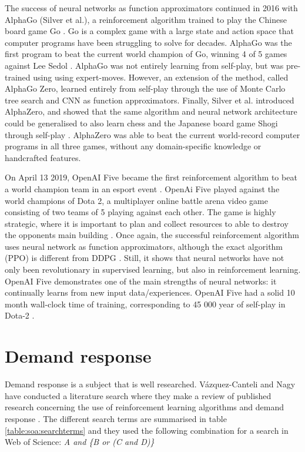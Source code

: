 \documentclass[class=book, crop=false, 11pt]{standalone}
\begin{document}
The success of neural networks as function approximators continued in 2016 with AlphaGo (Silver et al.), a reinforcement algorithm trained to play the Chinese board game Go \cite{alphago}. Go is a complex game with a large state and action space that computer programs have been struggling to solve for decades. AlphaGo was the first program to beat the current world champion of Go, winning 4 of 5 games against Lee Sedol \cite{Sutton1998}. AlphaGo was not entirely learning from self-play, but was pre-trained using using expert-moves. However, an extension of the method, called AlphaGo Zero, learned entirely from self-play through the use of Monte Carlo tree search and CNN as function approximators. Finally,  Silver et al. introduced AlphaZero, and showed that the same algorithm and neural network architecture could be generalised to also learn chess and the Japanese board game Shogi through self-play \cite{alphazero}. AlphaZero was able to beat the current world-record computer programs in all three games, without any domain-specific knowledge or handcrafted features. 

On April 13 2019, OpenAI Five became the first reinforcement algorithm to beat a world champion team in an esport event \cite{openai_dota}. OpenAi Five played against the world champions of Dota 2, a multiplayer online battle arena video game consisting of two teams of 5 playing against each other. The game is highly strategic, where it is important to plan and collect resources to able to destroy the opponents main building \cite{dota_wiki}. Once again, the successful reinforcement algorithm uses neural network as function approximators, although the exact algorithm (PPO) is different from DDPG \cite{PPO_openAI_Schulman}. Still, it shows that neural networks have not only been revolutionary in supervised learning, but also in reinforcement learning. OpenAI Five demonstrates one of the main strengths of neural networks: it continually learns from new input data/experiences. OpenAI Five had a solid 10 month wall-clock time of training, corresponding to 45 000 year of self-play in Dota-2 \cite{openai_dota}.


\section{Demand response}
Demand response is a subject that is well researched. Vázquez-Canteli and Nagy have conducted a literature search where they make a review of published research concerning the use of reinforcement learning algorithms and demand response \cite{vazquez2019reinforcement}. The different search terms are summarised in table \ref{table:soa:searchterms} and they used the following combination for a search in  Web of Science: \textit{A and \{B or (C and D)\}}
\end{document}
